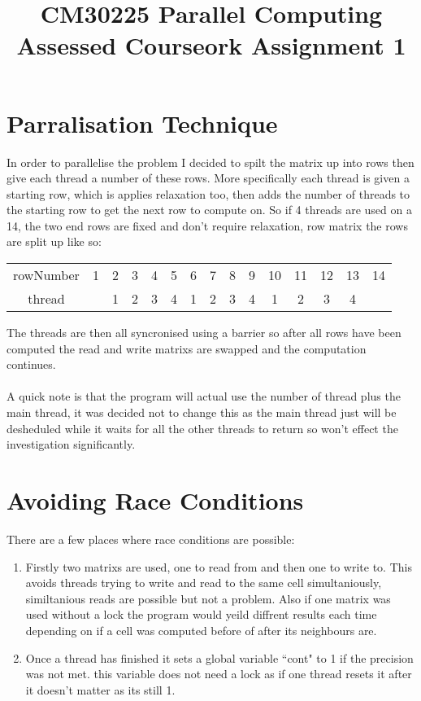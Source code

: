 \documentclass{article}
\begin{document}
\title{CM30225 Parallel Computing \\ Assessed Courseork Assignment 1}
\author{}

\maketitle

\section{Parralisation Technique}
In order to parallelise the problem I decided to spilt the matrix up into rows
then give each thread a number of these rows. More specifically each thread is
given a starting row, which is applies relaxation too, then adds the number of
threads to the starting row to get the next row to compute on. So if 4 threads
are used on a 14, the two end rows are fixed and don't require relaxation,
row matrix the rows are split up like so:

\begin{center}
\begin{tabular}{ |c|c|c|c|c|c|c|c|c|c|c|c|c|c|c| }
 \hline
 rowNumber & 1 & 2 & 3 & 4 & 5 & 6 & 7 & 8 & 9 & 10 & 11 & 12 & 13 & 14 \\
 thread &  & 1 & 2 & 3 & 4 & 1 & 2 & 3 & 4 & 1 & 2 & 3 & 4 &  \\
 \hline
\end{tabular}
\end{center}

The threads are then all syncronised using a barrier so after all rows have been
computed the read and write matrixs are swapped and the computation continues.\\~\\
A quick note is that the program will actual use the number of thread plus the
main thread, it was decided not to change this as the main thread just will be
desheduled while it waits for all the other threads to return so won't effect
the investigation significantly.

\section{Avoiding Race Conditions}
There are a few places where race conditions are possible:

\begin{enumerate}
\item Firstly two matrixs are used, one to read from and then one to write to.
This avoids threads trying to write and read to the same cell simultaniously,
similtanious reads are possible but not a problem. Also if one matrix was used without
a lock the program would yeild diffrent results each time depending on if a cell
was computed before of after its neighbours are.
\item Once a thread has finished it sets a global variable ``cont" to 1 if the
precision was not met. this variable does not need a lock as if one thread resets
it after it doesn't matter as its still 1.
\end{enumerate}
\end{document}
